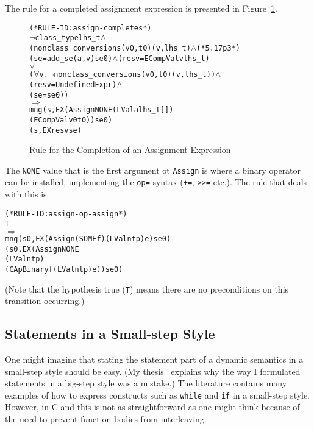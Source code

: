 \documentclass[11pt]{article}
\begin{document}
%
The rule for a completed assignment expression is presented in
Figure~\ref{fig:assign-completes}.
\begin{figure}[htbp]
\begin{center}
%
\begin{minipage}{\textwidth}
\begin{alltt}
(* RULE-ID: assign-completes *)
    \(\neg\)class_type lhs_t \(\land\)
    (nonclass_conversion s (v0,t0) (v,lhs_t) \(\land\) (* 5.17 p3 *)
     (se = add_se (a, v) se0) \(\land\) (resv = ECompVal v lhs_t)
                          \(\lor\)
     (\(\forall\)v. \(\neg\)nonclass_conversion s (v0, t0) (v, lhs_t)) \(\land\)
     (resv = UndefinedExpr) \(\land\)
     (se = se0))
   \(\Rightarrow\)
     mng (s, EX (Assign NONE (LVal a lhs_t [])
                             (ECompVal v0 t0)) se0)
         (s, EX resv se)
\end{alltt}
\end{minipage}
\end{center}
\caption{Rule for the Completion of an Assignment Expression}
\label{fig:assign-completes}
\end{figure}
The \texttt{NONE} value that is the first argument ot \texttt{Assign}
is where a binary operator can be installed, implementing the
\texttt{op=} syntax (\texttt{+=}, \texttt{>>=} etc.).  The rule that
deals with this is
%
\begin{alltt}
(* RULE-ID: assign-op-assign *)
     T
   \(\Rightarrow\)
     mng (s0, EX (Assign (SOME f) (LVal n t p) e) se0)
         (s0, EX (Assign NONE
                         (LVal n t p)
                         (CApBinary f (LVal n t p) e)) se0)

\end{alltt}
(Note that the hypothesis true (\texttt{T}) means there are no
preconditions on this transition occurring.)



\subsection{Statements in a Small-step Style}
\label{sec:small-step-stmts}

One might imagine that stating the statement part of a dynamic
semantics in a small-step style should be easy.  (My
thesis~\cite[\S7.1]{Norrish98} explains why the way I formulated
statements in a big-step style was a mistake.) The literature contains
many examples of how to express constructs such as \texttt{while} and
\texttt{if} in a small-step style.  However, in C and \cpp{} this is
not as straightforward as one might think because of the need to
prevent function bodies from interleaving.
\end{document}
